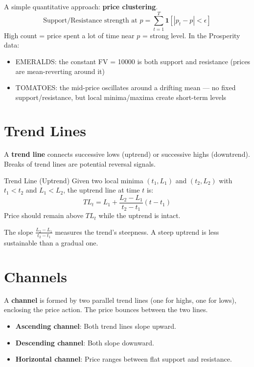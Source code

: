 \documentclass[12pt,a4paper,openany]{report}
\theoremstyle{definition}
\begin{document}
A simple quantitative approach: \textbf{price clustering}.
\begin{equation}
  \text{Support/Resistance strength at } p = \sum_{t=1}^{T} \mathbf{1}[|p_t - p| < \epsilon]
\end{equation}
High count = price spent a lot of time near $p$ = strong level. In the Prosperity data:
\begin{itemize}
  \item EMERALDS: the constant FV = 10000 is both support and resistance (prices are mean-reverting around it)
  \item TOMATOES: the mid-price oscillates around a drifting mean — no fixed support/resistance, but local minima/maxima create short-term levels
\end{itemize}

\section{Trend Lines}

A \textbf{trend line} connects successive lows (uptrend) or successive highs (downtrend). Breaks of trend lines are potential reversal signals.

\begin{definitionbox}{Trend Line (Uptrend)}
Given two local minima $(t_1, L_1)$ and $(t_2, L_2)$ with $t_1 < t_2$ and $L_1 < L_2$, the uptrend line at time $t$ is:
\[
  TL_t = L_1 + \frac{L_2 - L_1}{t_2 - t_1}(t - t_1)
\]
Price should remain above $TL_t$ while the uptrend is intact.
\end{definitionbox}

The slope $\frac{L_2 - L_1}{t_2 - t_1}$ measures the trend's steepness. A steep uptrend is less sustainable than a gradual one.

\section{Channels}

A \textbf{channel} is formed by two parallel trend lines (one for highs, one for lows), enclosing the price action. The price bounces between the two lines.

\begin{itemize}
  \item \textbf{Ascending channel}: Both trend lines slope upward.
  \item \textbf{Descending channel}: Both slope downward.
  \item \textbf{Horizontal channel}: Price ranges between flat support and resistance.
\end{itemize}
\end{document}
